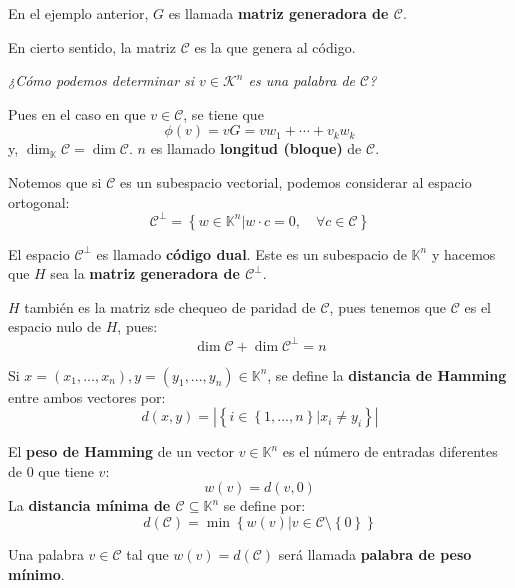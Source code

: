 \documentclass[12pt]{report}
\newcounter{it}
\theoremstyle{largebreak}
\newcommand\abs[1]{\ensuremath{\left|#1\right|}}
\begin{document}
    \begin{mydef}
        En el ejemplo anterior, $G$ es llamada \textbf{matriz generadora de $\mathcal{C}$}.
    \end{mydef}

    En cierto sentido, la matriz $\mathcal{C}$ es la que genera al código.

    \textit{¿Cómo podemos determinar si $v\in\mathcal{K}^n$ es una palabra de $\mathcal{C}$?}

    Pues en el caso en que $v\in\mathcal{C}$, se tiene que
    \begin{equation*}
        \phi(v)=vG=vw_1+\cdots+v_kw_k
    \end{equation*}
    y, $\dim_{\mathbb{K}}\mathcal{C}=\dim\mathcal{C}$. $n$ es llamado \textbf{longitud (bloque)} de $\mathcal{C}$.

    Notemos que si $\mathcal{C}$ es un subespacio vectorial, podemos considerar al espacio ortogonal:
    \begin{equation*}
        \mathcal{C}^\perp=\left\{w\in\mathbb{K}^n\Big|w\cdot c=0,\quad\forall c\in\mathcal{C} \right\}
    \end{equation*}

    \begin{mydef}
        El espacio $\mathcal{C}^\perp$ es llamado \textbf{código dual}. Este es un subespacio de $\mathbb{K}^n$ y hacemos que $H$ sea la \textbf{matriz generadora de $\mathcal{C}^\perp$}.
    \end{mydef}

    $H$ también es la matriz sde chequeo de paridad de $\mathcal{C}$, pues tenemos que $\mathcal{C}$ es el espacio nulo de $H$, pues:
    \begin{equation*}
        \dim\mathcal{C}+\dim\mathcal{C}^\perp=n
    \end{equation*}

    \begin{mydef}
        Si $x=(x_1,...,x_n),y=(y_1,...,y_n)\in\mathbb{K}^n$, se define la \textbf{distancia de Hamming} entre ambos vectores por:
        \begin{equation*}
            d(x,y)=\abs{\left\{i\in\left\{1,...,n \right\}\Big|x_i\neq y_i \right\}}
        \end{equation*}
    \end{mydef}

    \begin{mydef}
        El \textbf{peso de Hamming} de un vector $v\in\mathbb{K}^n$ es el número de entradas diferentes de 0 que tiene $v$:
        \begin{equation*}
            w(v)=d(v,0)
        \end{equation*}
        La \textbf{distancia mínima de $\mathcal{C}\subseteq\mathbb{K}^n$} se define por:
        \begin{equation*}
            d(\mathcal{C})=\min\left\{w(v)\Big|v\in\mathcal{C}\setminus\left\{0\right\} \right\}
        \end{equation*}

        Una palabra $v\in\mathcal{C}$ tal que $w(v)=d(\mathcal{C})$ será llamada \textbf{palabra de peso mínimo}.
    \end{mydef}
\end{document}
